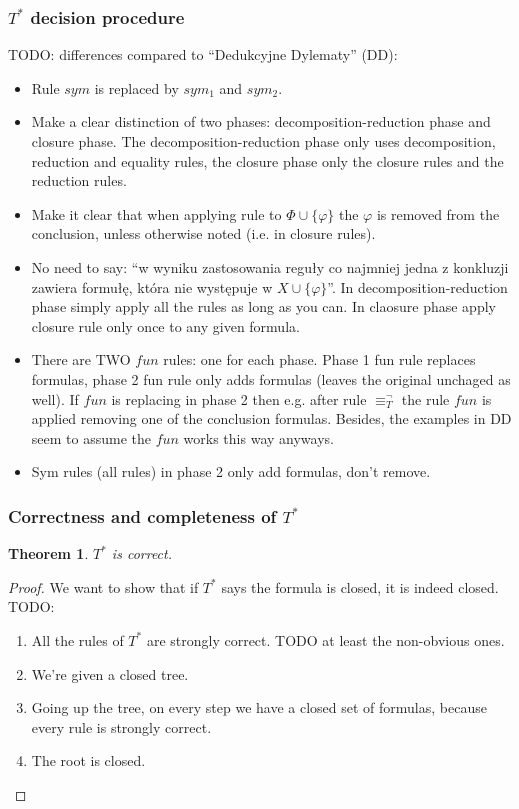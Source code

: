 \documentclass{article}
\newtheorem{theorem}{Theorem}
\theoremstyle{definition}
\newcommand*{\Ts}{T^*}
\begin{document}
\subsubsection{$\Ts$ decision procedure}
TODO: differences compared to \enquote{Dedukcyjne Dylematy} (DD):
\begin{itemize}
    \item Rule $sym$ is replaced by $sym_1$ and $sym_2$.
    \item Make a clear distinction of two phases: decomposition-reduction phase and closure phase. The decomposition-reduction phase only uses decomposition, reduction and equality rules, the closure phase only the closure rules and the reduction rules.
    \item Make it clear that when applying rule to $\Phi \cup \{\varphi\}$ the $\varphi$ is removed from the conclusion, unless otherwise noted (i.e. in closure rules).
    \item No need to say: \enquote{w wyniku zastosowania reguły co najmniej jedna z konkluzji zawiera formułę,
    która nie występuje w $X \cup \{\varphi\}$}. In decomposition-reduction phase simply apply all the rules as long as you can. In claosure phase apply closure rule only once to any given formula.
    \item There are TWO $fun$ rules: one for each phase. Phase 1 fun rule replaces formulas, phase 2 fun rule only adds formulas (leaves the original unchaged as well). If $fun$ is replacing in phase 2 then e.g. after rule $\equiv_T^\lnot$ the rule $fun$ is applied removing one of the conclusion formulas. Besides, the examples in DD seem to assume the $fun$ works this way anyways.
    \item Sym rules (all rules) in phase 2 only add formulas, don't remove.
\end{itemize}

\subsubsection{Correctness and completeness of $\Ts$}
\begin{theorem}
    $\Ts$ is correct.
\end{theorem}

\begin{proof}
We want to show that if $\Ts$ says the formula is closed, it is indeed closed. TODO:
\begin{enumerate}
    \item All the rules of $\Ts$ are strongly correct. TODO at least the non-obvious ones.
    \item We're given a closed tree.
    \item Going up the tree, on every step we have a closed set of formulas, because every rule is strongly correct.
    \item The root is closed.
\end{enumerate}
\end{proof}
\end{document}
